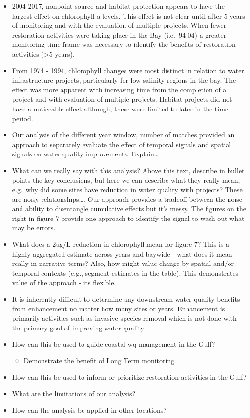 \documentclass[]{article}
\providecommand{\tightlist}{%
  \setlength{\itemsep}{0pt}\setlength{\parskip}{0pt}}
\begin{document}
\begin{itemize}
\item
  2004-2017, nonpoint source and habitat protection appears to have the
  largest effect on chlorophyll-a levels. This effect is not clear until
  after 5 years of monitoring and with the evaluation of multiple
  projects. When fewer restoration activities were taking place in the
  Bay (i.e.~94-04) a greater monitoring time frame was necessary to
  identify the benefits of restoration activities (\textgreater{}5
  years).
\item
  From 1974 - 1994, chlorophyll changes were most distinct in relation
  to water infrastructure projects, particularly for low salinity
  regions in the bay. The effect was more apparent with increasing time
  from the completion of a project and with evaluation of multiple
  projects. Habitat projects did not have a noticeable effect although,
  these were limited to later in the time period.
\item
  Our analysis of the different year window, number of matches provided
  an approach to separately evaluate the effect of temporal signals and
  spatial signals on water quality improvements. Explain\ldots{}
\item
  What can we really say with this analysis? Above this text, describe
  in bullet points the key conclusions, but here we can describe what
  they really mean, e.g.~why did some sites have reduction in water
  quality with projects? These are noisy relationships\ldots{}. Our
  approach provides a tradeoff between the noise and ability to
  disentangle cumulative effects but it's messy. The figures on the
  right in figure 7 provide one approach to identify the signal to wash
  out what may be errors.
\item
  What does a 2ug/L reduction in chlorophyll mean for figure 7? This is
  a highly aggregated estimate across years and baywide - what does it
  mean really in narrative terms? Also, how might value change by
  spatial and/or temporal contexts (e.g., segment estimates in the
  table). This demonstrates value of the approach - its flexible.
\item
  It is inherently difficult to determine any downstream water quality
  benefits from enhancement no matter how many sites or years.
  Enhancement is primarily activities such as invasive species removal
  which is not done with the primary goal of improving water quality.
\item
  How can this be used to guide coastal wq management in the Gulf?

  \begin{itemize}
  \tightlist
  \item
    Demonstrate the benefit of Long Term monitoring
  \end{itemize}
\item
  How can this be used to inform or prioritize restoration activities in
  the Gulf?
\item
  What are the limitations of our analysis?
\item
  How can the analysis be applied in other locations?
\end{itemize}
\end{document}
